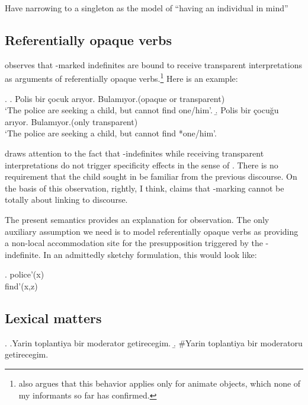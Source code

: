 \documentclass[11pt,a4paper]{article}
\begin{document}
Have narrowing to a singleton as the model of ``having an individual
in mind''

\subsection{Referentially opaque verbs}
\label{scopaque}

 observes that \acc-marked indefinites are bound to
receive transparent interpretations as arguments of referentially
opaque verbs.\footnote{ also argues that this behavior
applies only for animate objects, which none of my informants so
far has confirmed.} Here is an example:

\ex.\label{exseek}
\a.\label{exseekz}%
Polis bir çocuk arıyor. Bulamıyor.\hfill(opaque or transparent)\\ 
`The police are seeking a child, but cannot find one/him'.
\b.\label{exseeka}%
Polis bir çocuğu arıyor. Bulamıyor.\hfill(only transparent)\\
`The police are seeking a child, but cannot find *one/him'.


 draws attention to the fact that \acc-indefinites
while receiving transparent interpretations do not trigger specificity
effects in the sense of . There is no requirement that the
child sought in  be familiar from the previous
discourse.  On the basis of this observation, 
rightly, I think, claims that \acc-marking cannot be totally about
linking to discourse.

The present semantics provides an explanation for 
observation. The only auxiliary assumption we need is to model
referentially opaque verbs as providing a non-local accommodation site
for the presupposition triggered by the \acc-indefinite. In an
admittedly sketchy formulation, this would look like: 

\ex.
{police'(x)\\
		{find'(x,z)}
}


\subsection{Lexical matters}


\ex. \a.Yarin toplantiya bir moderator getirecegim.
\b. \#Yarin toplantiya bir moderatoru getirecegim.
\end{document}
